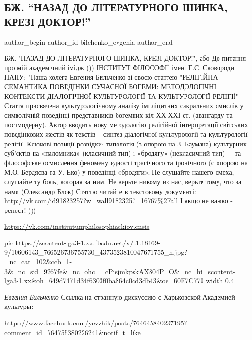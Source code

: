  
 
 
 
 
 
\subsection{БЖ. \enquote{НАЗАД ДО ЛІТЕРАТУРНОГО ШИНКА, КРЕЗІ ДОКТОР!}}
\label{sec:24_12_2014.fb.bilchenko_evgenia.1.imidzh_nauka}
\ifcmt
 author_begin
   author_id bilchenko_evgenia
 author_end
\fi

БЖ. "НАЗАД ДО ЛІТЕРАТУРНОГО ШИНКА, КРЕЗІ ДОКТОР!", або 
До питання про мій академічний імідж )))
ІНСТИТУТ ФІЛОСОФІЇ імені Г.С. Сковороди НАНУ:
"Наша колега Евгения Бильченко зі своєю статтею "РЕЛІГІЙНА СЕМАНТИКА ПОВЕДІНКИ СУЧАСНОЇ БОГЕМИ: МЕТОДОЛОГІЧНІ КОНТЕКСТИ ДІАЛОГІЧНОЇ КУЛЬТУРОЛОГІЇ ТА КУЛЬТУРОЛОГІЇ РЕЛІГІЇ"
Стаття присвячена культурологічному аналізу імпліцитних сакральних смислів у символічній поведінці представників богемних кіл ХХ-ХХІ ст. (авангарду та постмодерну). Автор вводить нову методологію релігійної інтерпретації світських поведінкових жестів як текстів – синтез діалогічної культурології та культурології релігії. Ключові позиції розвідки: типологія (з опорою на З. Баумана) культурних суб’єктів на «паломника» (класичний тип) і «бродягу» (некласичний тип) − та філософське осмислення феномену єдності трагічного та іронічного (с опорою на М.О. Бердяєва та У. Еко) у поведінці «бродяги».
Не слушайте нашего смеха, 
слушайте ту боль, которая за ним. 
Не верьте никому из нас, верьте тому, что за нами
(Олександр Блок)
Статтю читайте в текстовому документі: \url{http://vk.com/id91823257?w=wall91823257_16767%2Fall} 
І якщо не важко - репост! )))

\url{https://vk.com/institutumphilosophiaekioviensis}

\ifcmt
  pic https://scontent-lga3-1.xx.fbcdn.net/v/t1.18169-9/10606143_766526736755730_4373523810047671755_n.jpg?_nc_cat=102&ccb=1-3&_nc_sid=9267fe&_nc_ohc=_cPisjmkpskAX804P_O&_nc_ht=scontent-lga3-1.xx&oh=649d7471d34f6303f0ba864c0cd3db43&oe=60E7C770
  width 0.4
\fi

\emph{Евгения Бильченко}
Ссылка на странную дискуссию с Харьковской Академией культуры:\par
\url{https://www.facebook.com/yevzhik/posts/764645840237195?comment_id=764755380226241&notif_t=like}
